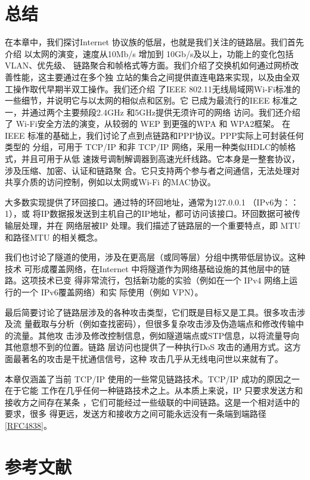 \section{总结}

在本章中，我们探讨Internet 协议族的低层，也就是我们关注的链路层。我们首先介绍
以太网的演变，速度从10Mb/s 增加到 10Gb/s及以上，功能上的变化包括VLAN、优先级、
链路聚合和帧格式等方面。我们介绍了交换机如何通过网桥改善性能，这主要通过在多个独
立站的集合之间提供直连电路来实现，以及由全双工操作取代早期半双工操作。我们还介绍
了IEEE 802.11无线局域网Wi-Fi标准的一些细节，并说明它与以太网的相似点和区别。它
已成为最流行的IEEE 标准之一，并通过两个主要频段2.4GHz 和5GHz提供无须许可的网络
访问。我们还介绍了 Wi-Fi安全方法的演变，从较弱的 WEP 到更强的WPA 和 WPA2框架。
在IEEE 标准的基础上，我们讨论了点到点链路和PPP协议。PPP实际上可封装任何类型的
分组，可用于 TCP/IP 和非 TCP/IP 网络，采用一种类似HDLC的帧格式，并且可用于从低
速拨号调制解调器到高速光纤线路。它本身是一整套协议，涉及压缩、加密、认证和链路聚
合。它只支持两个参与者之间通信，无法处理对共享介质的访问控制，例如以太网或Wi-Fi
的MAC协议。

大多数实现提供了环回接口。通过特的环回地址，通常为127.0.0.1 （IPv6为：：1），或
将IP数据报发送到主机自己的IP地址，都可访问该接口。环回数据可被传输层处理，并在
网络层被IP 处理。我们描述了链路层的一个重要特点，即 MTU 和路径MTU 的相关概念。

我们也讨论了隧道的使用，涉及在更高层（或同等层）分组中携带低层协议。这种技术
可形成覆盖网络，在Internet 中将隧道作为网络基础设施的其他层中的链路。这项技术已变
得非常流行，包括新功能的实验（例如在一个 IPv4 网络上运行的一个 IPv6覆盖网络）和实
际使用（例如 VPN）。

最后简要讨论了链路层涉及的各种攻击类型，它们既是目标又是工具。很多攻击涉及流
量截取与分析（例如查找密码），但很多复杂攻击涉及伪造端点和修改传输中的流量。其他攻
击涉及修改控制信息，例如隧道端点或STP信息，以将流量导向其他意想不到的位置。链路
层访问也提供了一种执行DoS 攻击的通用方式。这方面最著名的攻击是干扰通信信号，这种
攻击几乎从无线电问世以来就有了。

本章仅涵盖了当前 TCP/IP 使用的一些常见链路技术。TCP/IP 成功的原因之一在于它能
工作在几乎任何一种链路技术之上。从本质上来说，IP 只要求发送方和接收方之间存在某条
，它们可能经过一些级联的中间链路。这是一个相对适中的要求，很多
得更远，发送方和接收方之间可能永远没有一条端到端路径\href{https://www.rfc-editor.org/rfc/rfc4838}{[RFC4838]}。

\section{参考文献}

